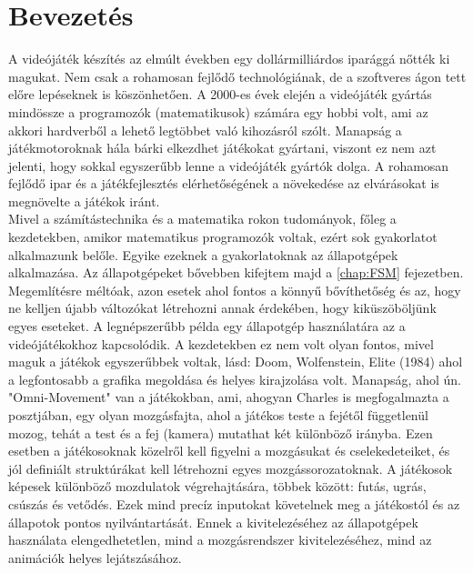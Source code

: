 \chapter{Bevezetés}

A videójáték készítés az elmúlt években egy dollármilliárdos iparággá nőtték ki magukat. Nem csak a rohamosan fejlődő technológiának, de a szoftveres ágon tett előre lepéseknek is köszönhetően. A 2000-es évek elején a videójáték gyártás mindössze a programozók (matematikusok) számára egy hobbi volt, ami az akkori hardverből a lehető legtöbbet való kihozásról szólt. Manapság a játékmotoroknak hála bárki elkezdhet játékokat gyártani, viszont ez nem azt jelenti, hogy sokkal egyszerűbb lenne a videójáték gyártók dolga. A rohamosan fejlődő ipar és a játékfejlesztés elérhetőségének a növekedése az elvárásokat is megnövelte a játékok iránt.\\

Mivel a számítástechnika és a matematika rokon tudományok, főleg a kezdetekben, amikor matematikus programozók voltak, ezért sok gyakorlatot alkalmazunk belőle. Egyike ezeknek a gyakorlatoknak az állapotgépek alkalmazása. Az állapotgépeket bővebben kifejtem majd a \autoref{chap:FSM} fejezetben. Megemlítésre méltóak, azon esetek ahol fontos a könnyű bővíthetőség és az, hogy ne kelljen újabb változókat létrehozni annak érdekében, hogy kiküszöböljünk egyes eseteket. A legnépszerűbb példa egy állapotgép használatára az a videójátékokhoz kapcsolódik. A kezdetekben ez nem volt olyan fontos, mivel maguk a játékok egyszerűbbek voltak, lásd: Doom, Wolfenstein, Elite (1984) ahol a legfontosabb a grafika megoldása és helyes kirajzolása volt. Manapság, ahol ún. "Omni-Movement" van a játékokban, ami, ahogyan Charles\cite{charles2024} is megfogalmazta a posztjában, egy olyan mozgásfajta, ahol a játékos teste a fejétől függetlenül mozog, tehát a test és a fej (kamera) mutathat két különböző irányba. Ezen esetben a játékosoknak közelről kell figyelni a mozgásukat és cselekedeteiket, és jól definiált struktúrákat kell létrehozni egyes mozgássorozatoknak. A játékosok képesek különböző mozdulatok végrehajtására, többek között: futás, ugrás, csúszás és vetődés. Ezek mind precíz inputokat követelnek meg a játékostól és az állapotok pontos nyilvántartását. Ennek a kivitelezéséhez az állapotgépek használata elengedhetetlen, mind a mozgásrendszer kivitelezéséhez, mind az animációk helyes lejátszásához.\\

